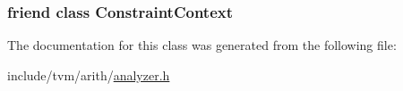 \subsubsection[{\texorpdfstring{Constraint\+Context}{ConstraintContext}}]{\setlength{\rightskip}{0pt plus 5cm}friend class {\bf Constraint\+Context}\hspace{0.3cm}{\ttfamily [friend]}}\hypertarget{classtvm_1_1arith_1_1CanonicalSimplifier_ab8bf22547cf1df0a28fc4ee98841ab89}{}\label{classtvm_1_1arith_1_1CanonicalSimplifier_ab8bf22547cf1df0a28fc4ee98841ab89}


The documentation for this class was generated from the following file\+:\begin{DoxyCompactItemize}
\item 
include/tvm/arith/\hyperlink{analyzer_8h}{analyzer.\+h}\end{DoxyCompactItemize}
